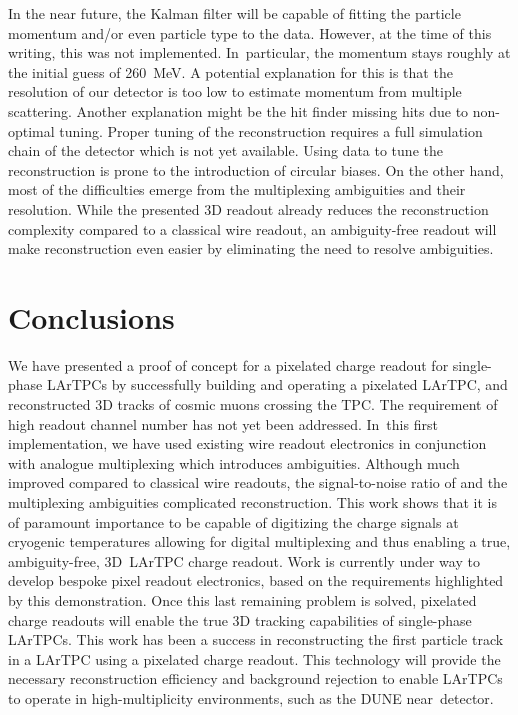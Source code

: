 \documentclass[instruments,article,accept,moreauthors,pdftex]{Definitions/mdpi}
\begin{document}
\afterpage{\clearpage}

In the near future, the Kalman filter will be capable of fitting the particle momentum and/or even particle type to the data.
However, at the time of this writing, this was not implemented.
In~particular, the momentum stays roughly at the initial guess of \SI{260}{\mega\electronvolt}.
A potential explanation for this is that the resolution of our detector is too low to estimate momentum from multiple scattering.
Another explanation might be the hit finder missing hits due to non-optimal tuning.
Proper tuning of the reconstruction requires a full simulation chain of the detector which is not yet available.
Using data to tune the reconstruction is prone to the introduction of circular biases.
On the other hand, most of the difficulties emerge from the multiplexing ambiguities and their resolution.
While the presented 3D readout already reduces the reconstruction complexity compared to a classical wire readout, an ambiguity-free readout will make reconstruction even easier by eliminating the need to resolve ambiguities.



\section{Conclusions} \label{sec:Summary}

We have presented a proof of concept for a pixelated charge readout for single-phase LArTPCs by successfully building and operating a pixelated LArTPC, and reconstructed 3D tracks of cosmic muons crossing the TPC.
The requirement of high readout channel number has not yet been addressed.
In~this first implementation, we have used existing wire readout electronics in conjunction with analogue multiplexing which introduces ambiguities.
Although much improved compared to classical wire readouts, the signal-to-noise ratio of and the multiplexing ambiguities complicated reconstruction.
This work shows that it is of paramount importance to be capable of digitizing the charge signals at cryogenic temperatures allowing for digital multiplexing and thus enabling a true, ambiguity-free, 3D~LArTPC charge readout.
Work is currently under way to develop bespoke pixel readout electronics, based on the requirements highlighted by this demonstration. 
Once this last remaining problem is solved, pixelated charge readouts will enable the true 3D tracking capabilities of single-phase LArTPCs.
This work has been a success in reconstructing the first particle track in a LArTPC using a pixelated charge readout.   
This technology will provide the necessary reconstruction efficiency and background rejection to enable LArTPCs to operate in high-multiplicity environments, such as the DUNE near~detector.
\end{document}
